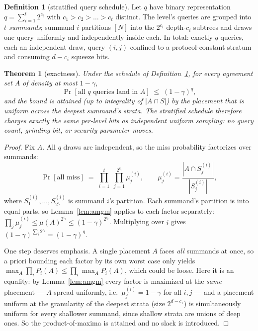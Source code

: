 \documentclass[11pt]{article}
\newtheorem{theorem}{Theorem}
\theoremstyle{definition}
\newtheorem{definition}{Definition}
\begin{document}
\begin{definition}[stratified query schedule]\label{def:scheme}
Let $q$ have binary representation $q = \sum_{i=1}^{t} 2^{c_i}$ with
$c_1 > c_2 > \dots > c_t$ distinct. The level's queries are grouped
into $t$ \emph{summands}; summand $i$ partitions $[N]$ into the
$2^{c_i}$ depth-$c_i$ subtrees and draws one query uniformly and
independently inside each. In total: exactly $q$ queries, each an
independent draw, query $(i,j)$ confined to a protocol-constant
stratum and consuming $d - c_i$ squeeze bits.
\end{definition}

\begin{theorem}[exactness]\label{thm:main}
Under the schedule of Definition~\ref{def:scheme}, for every agreement
set $A$ of density at most $1-\gamma$,
\[
\Pr[\text{all $q$ queries land in } A] \;\le\; (1-\gamma)^{q},
\]
and the bound is attained (up to integrality of $|A \cap S|$) by the
placement that is uniform across the deepest summand's strata. The
stratified schedule therefore charges exactly the same per-level bits
as independent uniform sampling: no query count, grinding bit, or
security parameter moves.
\end{theorem}

\begin{proof}
Fix $A$. All $q$ draws are independent, so the miss probability
factorizes over summands:
\[
\Pr[\text{all miss}] \;=\; \prod_{i=1}^{t} \; \prod_{j=1}^{2^{c_i}}
\mu^{(i)}_j ,
\qquad
\mu^{(i)}_j = \frac{|A \cap S^{(i)}_j|}{|S^{(i)}_j|},
\]
where $S^{(i)}_1, \dots, S^{(i)}_{2^{c_i}}$ is summand $i$'s partition.
Each summand's partition is into equal parts, so
Lemma~\ref{lem:amgm} applies to each factor separately:
$\prod_j \mu^{(i)}_j \le \mu(A)^{2^{c_i}} \le (1-\gamma)^{2^{c_i}}$.
Multiplying over $i$ gives $(1-\gamma)^{\sum_i 2^{c_i}} =
(1-\gamma)^q$.

One step deserves emphasis. A single placement $A$ faces \emph{all}
summands at once, so a priori bounding each factor by its own worst
case only yields
$\max_A \prod_i P_i(A) \le \prod_i \max_A P_i(A)$, which could be
loose. Here it is an equality: by Lemma~\ref{lem:amgm} every factor is
maximized at the \emph{same} placement --- $A$ spread uniformly, i.e.\
$\mu^{(i)}_j = 1-\gamma$ for all $i, j$ --- and a placement uniform at
the granularity of the deepest strata (size $2^{d-c_1}$) is
simultaneously uniform for every shallower summand, since shallow
strata are unions of deep ones. So the product-of-maxima is attained
and no slack is introduced.
\end{proof}
\end{document}
